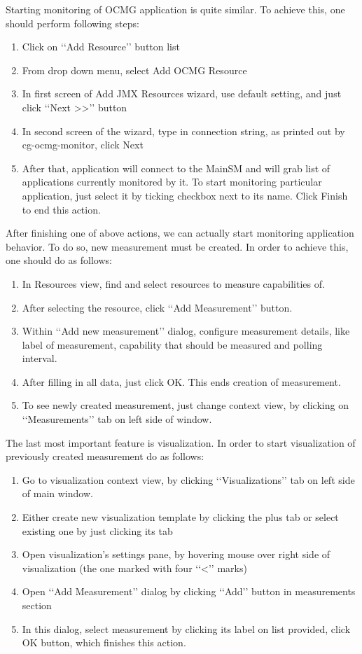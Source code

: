 Starting monitoring of OCMG application is quite similar. To achieve this, one should perform following steps:

\begin{enumerate}
\item Click on \lq\lq{}Add Resource\rq\rq{} button list 
\item From drop down menu, select Add OCMG Resource
\item In first screen of Add JMX Resources wizard, use default setting, and just click \lq\lq{}Next >>\rq\rq{} button
\item In second screen of the wizard, type in connection string, as printed out by cg-ocmg-monitor, click Next
\item After that, application will connect to the MainSM and will grab list of applications currently monitored by it. To start monitoring particular application, just select it by ticking checkbox next to its name. Click Finish to end this action.
\end{enumerate}

After finishing one of above actions, we can actually start monitoring application behavior. To do so, new measurement must be created. In order to achieve this, one should do as follows:

\begin{enumerate}
\item In Resources view, find and select resources to measure capabilities of.
\item After selecting the resource, click \lq\lq{}Add Measurement\rq\rq{} button.
\item Within \lq\lq{}Add new measurement\rq\rq{} dialog, configure measurement details, like label of measurement, capability that should be measured and polling interval.
\item After filling in all data, just click OK. This ends creation of measurement.  
\item To see newly created measurement, just change context view, by clicking on \lq\lq{}Measurements\rq\rq{} tab on left side of window.
\end{enumerate}

The last most important feature is visualization. In order to start visualization of previously created measurement do as follows:

\begin{enumerate}
\item Go to visualization context view, by clicking \lq\lq{}Visualizations\rq\rq{} tab on left side of main window.
\item Either create new visualization template by clicking the plus tab or select existing one by just clicking its tab
\item Open visualization\rq{}s settings pane, by hovering mouse over right side of visualization (the one marked with four \lq\lq{}<\rq\rq{} marks)
\item Open \lq\lq{}Add Measurement\rq\rq{} dialog by clicking \lq\lq{}Add\rq\rq{} button in measurements section
\item In this dialog, select measurement by clicking its label on list provided, click OK button, which finishes this action.
\end{enumerate}

